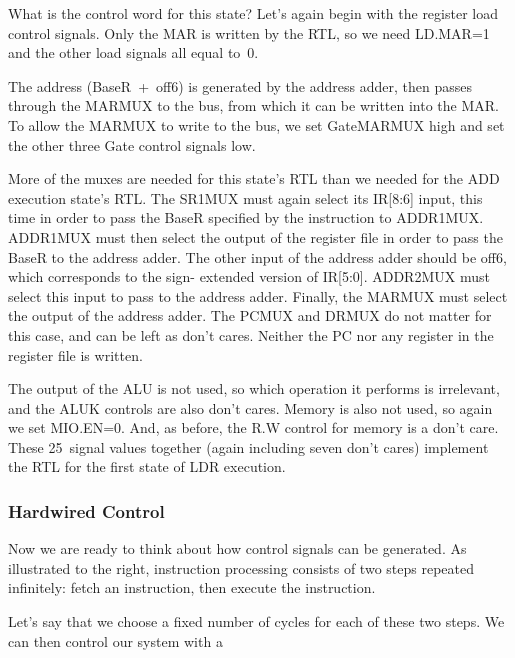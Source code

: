What is the control word for this state?
%
Let's again begin with the register load control signals.  Only the
MAR is written by the RTL, so we need LD.MAR=1 and the other load
signals all equal to~0.

The address (BaseR~+~off6) is generated by the address adder, then 
passes through the MARMUX to the bus, from which it can be written into
the MAR.  To allow the MARMUX to write to the bus, we set GateMARMUX
high and set the other three Gate control signals low.

More of the muxes are needed for this state's RTL than we needed for
the ADD execution state's RTL.
%
The SR1MUX must again select its IR[8:6] input, this time in order to 
pass the BaseR specified by the instruction to ADDR1MUX.  ADDR1MUX
must then select the output of the register file in order to pass the 
BaseR to the address adder.  The other input of the address adder should
be off6, which corresponds to the sign-\linebreak
extended version of IR[5:0].
ADDR2MUX must select this input to pass to the address adder. 
Finally, the MARMUX must select the output of the address adder.
The PCMUX and DRMUX do not matter for this case, and can be left as
don't cares.  Neither the PC nor any register in the register file
is written.

The output of the ALU is not used, so which operation it performs is 
irrelevant, and the ALUK controls are also don't cares.  Memory is
also not used, so again we set MIO.EN=0.  And, as before, the R.W
control for memory is a don't care.
%
These 25~signal values together (again including seven don't cares)
implement the RTL for the first state of LDR execution.\\


\subsubsection{Hardwired Control}

\begin{minipage}{3.75in}
Now we are ready to think about how control signals can be generated.
%
As illustrated to the right, instruction processing consists of two 
steps repeated infinitely: fetch an instruction, then execute the 
instruction.\mpline

Let's say that we choose a fixed number of cycles for each of these two
steps.  We can then control our system with a\linebreak
\end{minipage}\hspace{0.25in}%
\begin{minipage}{2.5in}
\\
\end{minipage}\mpdone


